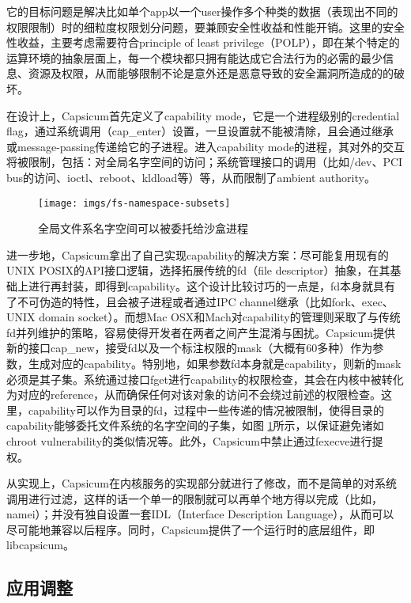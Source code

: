 它的目标问题是解决比如单个app以一个user操作多个种类的数据（表现出不同的权限限制）时的细粒度权限划分问题，要兼顾安全性收益和性能开销。这里的安全性收益，主要考虑需要符合principle of least privilege（POLP），即在某个特定的运算环境的抽象层面上，每一个模块都只拥有能达成它合法行为的必需的最少信息、资源及权限，从而能够限制不论是意外还是恶意导致的安全漏洞所造成的的破坏。

在设计上，Capsicum首先定义了capability mode，它是一个进程级别的credential flag，通过系统调用（cap\_enter）设置，一旦设置就不能被清除，且会通过继承或message-passing传递给它的子进程。进入capability mode的进程，其对外的交互将被限制，包括：对全局名字空间的访问；系统管理接口的调用（比如/dev、PCI bus的访问、ioctl、reboot、kldload等）等，从而限制了ambient authority。

\begin{figure}[!htp]
  \centering
  \texttt{[image: imgs/fs-namespace-subsets]}
  \caption{全局文件系名字空间可以被委托给沙盒进程}
  \label{fig:fd-namespace-subsets}
\end{figure}

进一步地，Capsicum拿出了自己实现capability的解决方案：尽可能复用现有的UNIX POSIX的API接口逻辑，选择拓展传统的fd（file descriptor）抽象，在其基础上进行再封装，即得到capability。这个设计比较讨巧的一点是，fd本身就具有了不可伪造的特性，且会被子进程或者通过IPC channel继承（比如fork、exec、UNIX domain socket）。而想Mac OSX和Mach对capability的管理则采取了与传统fd并列维护的策略，容易使得开发者在两者之间产生混淆与困扰。Capsicum提供新的接口cap\_new，接受fd以及一个标注权限的mask（大概有60多种）作为参数，生成对应的capability。特别地，如果参数fd本身就是capability，则新的mask必须是其子集。系统通过接口fget进行capability的权限检查，其会在内核中被转化为对应的reference，从而确保任何对该对象的访问不会绕过前述的权限检查。这里，capability可以作为目录的fd，过程中一些传递的情况被限制，使得目录的capability能够委托文件系统的名字空间的子集，如图 \ref{fig:fd-namespace-subsets}所示，以保证避免诸如chroot vulnerability的类似情况等。此外，Capsicum中禁止通过fexecve进行提权。

从实现上，Capsicum在内核服务的实现部分就进行了修改，而不是简单的对系统调用进行过滤，这样的话一个单一的限制就可以再单个地方得以完成（比如，namei）；并没有独自设置一套IDL（Interface Description Language），从而可以尽可能地兼容以后程序。同时，Capsicum提供了一个运行时的底层组件，即libcapsicum。

\subsection{应用调整}
\label{sss:adoption}

